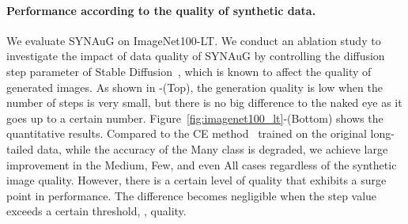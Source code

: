 \paragraph{Performance according to the quality of synthetic data.}
We evaluate SYNAuG on ImageNet100-LT.
We conduct an ablation study to investigate the impact of data quality of
SYNAuG by controlling the diffusion step parameter
of Stable Diffusion~\cite{rombach2022high}, which is known to affect the quality of generated images.
As shown in 
-(Top), the generation quality is low when the number of steps is very small, but there is no big difference to the naked eye as it goes up to a certain number.
Figure~\ref{fig:imagenet100_lt}-(Bottom) shows the quantitative results.
Compared to the CE method~\cite{cui2019class} trained on the original long-tailed data, while the accuracy of the Many class is degraded, we achieve large improvement in the Medium, Few, and even All cases
regardless of the synthetic image quality.
However, there is a certain level of quality that exhibits a surge point in performance.
The difference becomes negligible when 
the step value exceeds a certain threshold, \ie, quality.


